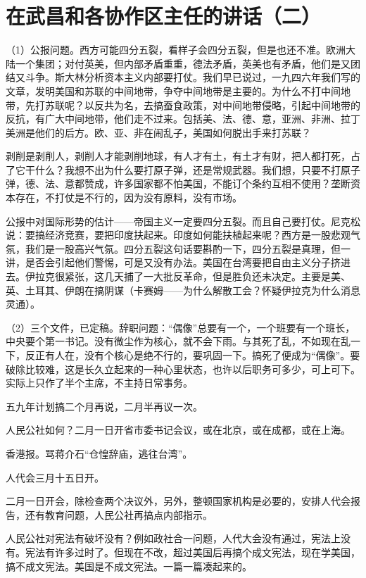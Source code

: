 \section[在武昌和各协作区主任的讲话（二）（一九五八年十二月十二日）]{在武昌和各协作区主任的讲话（二）}


（1）公报问题。西方可能四分五裂，看样子会四分五裂，但是也还不准。欧洲大陆一个集团；对付英美，但内部矛盾重重，德法矛盾，英美也有矛盾，他们是又团结又斗争。斯大林分析资本主义内部要打仗。我们早已说过，一九四六年我们写的文章，发明美国和苏联的中间地带，争夺中间地带是主要的。为什么不打中间地带，先打苏联呢？以反共为名，去搞蚕食政策，对中间地带侵略，引起中间地带的反抗，有广大中间地带，他们走不过来。包括美、法、德、意，亚洲、非洲、拉丁美洲是他们的后方。欧、亚、非在闹乱子，美国如何脱出手来打苏联？

剥削是剥削人，剥削人才能剥削地球，有人才有土，有土才有财，把人都打死，占了它干什么？我想不出为什么要打原子弹，还是常规武器。我们想，只要不打原子弹，德、法、意都赞成，许多国家都不怕美国，不能订个条约互相不使用？垄断资本存在，不打仗是不行的，因为没有原料，没有市场。

公报中对国际形势的估计——帝国主义一定要四分五裂。而且自己要打仗。尼克松说：要搞经济竞赛，要把印度扶起来。印度如何能扶植起来呢？西方是一股悲观气氛，我们是一股高兴气氛。四分五裂这句话要斟酌一下，四分五裂是真理，但一讲，是否会引起他们警惕，可是又没有办法。美国在台湾要把自由主义分子挤进去。伊拉克很紧张，这几天捕了一大批反革命，但是胜负还未决定。主要是美、英、土耳其、伊朗在搞阴谋（卡赛姆——为什么解散工会？怀疑伊拉克为什么消息灵通）。

（2）三个文件，已定稿。辞职问题：“偶像”总要有一个，一个班要有一个班长，中央要个第一书记。没有微尘作为核心，就不会下雨。与其死了乱，不如现在乱一下，反正有人在，没有个核心是绝不行的，要巩固一下。搞死了便成为“偶像”。要破除比较难，这是长久立起来的一种心里状态，也许以后职务可多少，可上可下。实际上只作了半个主席，不主持日常事务。

五九年计划搞二个月再说，二月半再议一次。

人民公社如何？二月一日开省市委书记会议，或在北京，或在成都，或在上海。

香港报。骂蒋介石“仓惶辞庙，逃往台湾”。

人代会三月十五日开。

二月一日开会，除检查两个决议外，另外，整顿国家机构是必要的，安排人代会报告，还有教育问题，人民公社再搞点内部指示。

人民公社对宪法有破坏没有？例如政社合一问题，人代大会没有通过，宪法上没有。宪法有许多过时了。但现在不改，超过美国后再搞个成文宪法，现在学美国，搞不成文宪法。美国是不成文宪法。一篇一篇凑起来的。

